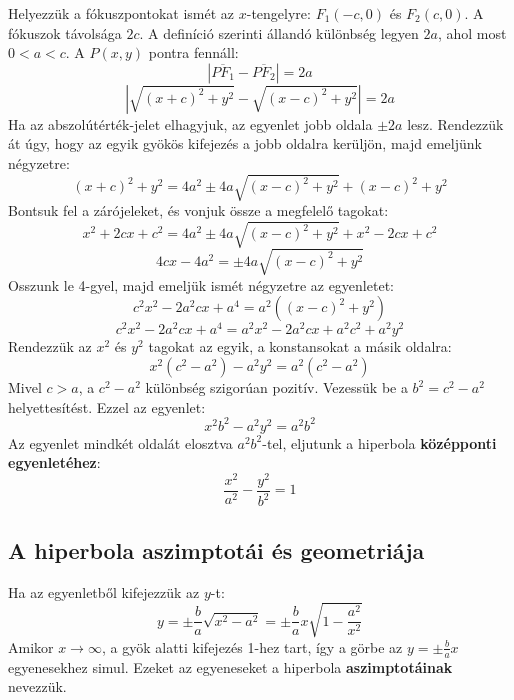 \documentclass[12pt, a4paper]{article}
\newcommand{\textbfr}[1]{\textbf{\textcolor{bvred}{#1}}}
\begin{document}
Helyezzük a fókuszpontokat ismét az $x$-tengelyre: $F_1(-c, 0)$ és $F_2(c, 0)$. A fókuszok távolsága $2c$. A definíció szerinti állandó különbség legyen $2a$, ahol most $0 < a < c$.
A $P(x,y)$ pontra fennáll:
\[ \left| \overline{PF_1} - \overline{PF_2} \right| = 2a \]
\[ \left| \sqrt{(x+c)^2 + y^2} - \sqrt{(x-c)^2 + y^2} \right| = 2a \]
Ha az abszolútérték-jelet elhagyjuk, az egyenlet jobb oldala $\pm 2a$ lesz. Rendezzük át úgy, hogy az egyik gyökös kifejezés a jobb oldalra kerüljön, majd emeljünk négyzetre:
\[ (x+c)^2 + y^2 = 4a^2 \pm 4a\sqrt{(x-c)^2 + y^2} + (x-c)^2 + y^2 \]
Bontsuk fel a zárójeleket, és vonjuk össze a megfelelő tagokat:
\[ x^2 + 2cx + c^2 = 4a^2 \pm 4a\sqrt{(x-c)^2 + y^2} + x^2 - 2cx + c^2 \]
\[ 4cx - 4a^2 = \pm 4a\sqrt{(x-c)^2 + y^2} \]
Osszunk le 4-gyel, majd emeljük ismét négyzetre az egyenletet:
\[ c^2x^2 - 2a^2cx + a^4 = a^2 \left( (x-c)^2 + y^2 \right) \]
\[ c^2x^2 - 2a^2cx + a^4 = a^2x^2 - 2a^2cx + a^2c^2 + a^2y^2 \]
Rendezzük az $x^2$ és $y^2$ tagokat az egyik, a konstansokat a másik oldalra:
\[ x^2(c^2 - a^2) - a^2y^2 = a^2(c^2 - a^2) \]
Mivel $c > a$, a $c^2 - a^2$ különbség szigorúan pozitív. Vezessük be a $b^2 = c^2 - a^2$ helyettesítést. Ezzel az egyenlet:
\[ x^2b^2 - a^2y^2 = a^2b^2 \]
Az egyenlet mindkét oldalát elosztva $a^2b^2$-tel, eljutunk a hiperbola \textbfr{középponti egyenletéhez}:
\[ \frac{x^2}{a^2} - \frac{y^2}{b^2} = 1 \]

\subsection*{A hiperbola aszimptotái és geometriája}

Ha az egyenletből kifejezzük az $y$-t:
\[ y = \pm \frac{b}{a} \sqrt{x^2 - a^2} = \pm \frac{b}{a} x \sqrt{1 - \frac{a^2}{x^2}} \]
Amikor $x \to \infty$, a gyök alatti kifejezés 1-hez tart, így a görbe az $y = \pm \frac{b}{a}x$ egyenesekhez simul. Ezeket az egyeneseket a hiperbola \textbfr{aszimptotáinak} nevezzük.
\end{document}
